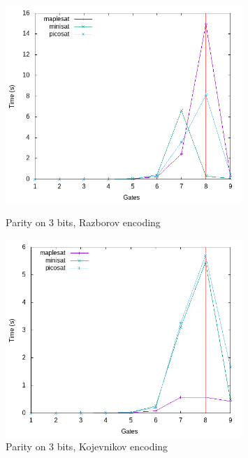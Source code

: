 \documentclass{article}
\begin{document}
\begin{figure}[h!]
\centering
\includegraphics[width=0.8\textwidth]{images/times/3parity_raz.png}  
\caption{Parity on 3 bits, Razborov encoding}
\includegraphics[width=0.8\textwidth]{images/times/3parity_kulikov.png}  
\caption{Parity on 3 bits, Kojevnikov encoding}
\end{figure}
\end{document}
